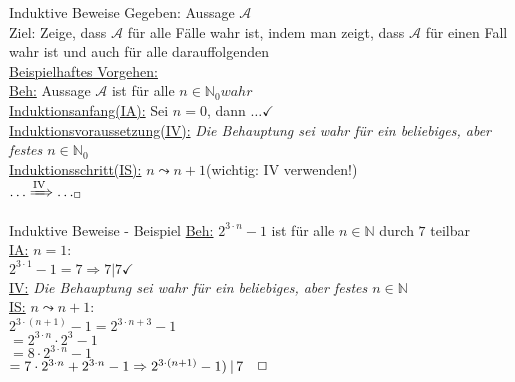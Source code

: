 \begin{frame}{Induktive Beweise}
	Gegeben: Aussage $\mathcal{A}$\\
	Ziel: Zeige, dass $\mathcal{A}$ für alle Fälle wahr ist, indem man zeigt, dass $\mathcal{A}$ für einen Fall wahr ist und auch für alle darauffolgenden\\
	\underline{Beispielhaftes Vorgehen:}\\
	\underline{Beh:} Aussage $\mathcal{A}$ ist für alle $n\in\mathbb{N}_{0} wahr$\\
	\underline{Induktionsanfang(IA):} Sei $n=0$, dann $\dots\checkmark$\\
	\underline{Induktionsvoraussetzung(IV):} \emph{Die Behauptung sei wahr für ein beliebiges, aber festes $n\in\mathbb{N}_{0}$}\\
	\underline{Induktionsschritt(IS):} $n\leadsto n+1$\hfill (wichtig: IV verwenden!)\\
	\qquad $\dots\xRightarrow{\text{IV}}\dots _{\Box}$
\end{frame}

\begin{frame}{Induktive Beweise - Beispiel}
	\underline{Beh:} $2^{3\cdot n}-1$ ist für alle $n\in\mathbb{N}$ durch $7$ teilbar\\
	\underline{IA:} $n=1:$\\
	\qquad $2^{3\cdot 1}-1=7 \Rightarrow 7\vert 7\checkmark$\\
	\underline{IV:} \emph{Die Behauptung sei wahr für ein beliebiges, aber festes $n\in\mathbb{N}$}\\
	\underline{IS:} $n\leadsto n+1:$\\
	\qquad $2^{3\cdot(n+1)}-1 = 2^{3\cdot n+3}-1$\\
	\pause
	\qquad $=2^{3\cdot n}\cdot 2^{3}-1$\\
	\pause
	\qquad $=8\cdot 2^{3\cdot n}-1$\\
	\pause
	\qquad $=7\cdot2^{3\cdot n}+2^{3\cdot n}-1\Rightarrow 2^{3\cdot(n+1)}-1)\medspace\vert\thinspace 7\quad\Box$\\
\end{frame}

